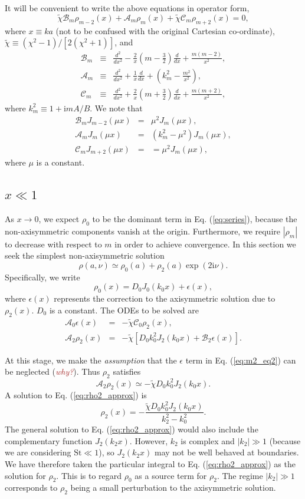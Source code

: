 \documentclass[apj]{emulateapj}
\def\brown#1{\textcolor{brown}{#1}}
\newcommand{\comm}[1]{({\it \brown{#1}})}
\newcommand{\Eq}[1]{Eq. (\ref{#1})}
\newcommand{\eq}[1]{\Eq{#1}}
\newcommand{\beq}{\begin{equation}}
\newcommand{\eeq}{\end{equation}}
\newcommand{\beqn}{\begin{eqnarray}}
\newcommand{\eeqn}{\end{eqnarray}}
\begin{document}
It will be convenient to write the above equations
in operator form,
\beq\label{eq:ode2}
\tilde{\chi}\mathcal{B}_m\rho_{m-2}(x) + \mathcal{A}_m\rho_m(x) + \tilde{\chi}\mathcal{C}_m\rho_{m+2}(x)=0,
\eeq
where $x\equiv ka$ (not to be confused with the original Cartesian
co-ordinate), $\tilde{\chi}\equiv(\chi^2-1)/[2(\chi^2+1)]$, and 
\beqn\label{eq:ops}
\mathcal{B}_m &\equiv& \frac{d^2}{dx^2} -
\frac{2}{x}\left(m-\frac{3}{2}\right)\frac{d}{dx} + \frac{m(m-2)}{x^2},\\
\mathcal{A}_m &\equiv& \frac{d^2}{dx^2} + \frac{1}{x}\frac{d}{dx} +
\left(k_m^2 - \frac{m^2}{x^2}\right),\\
\mathcal{C}_m  &\equiv& \frac{d^2}{dx^2} +
\frac{2}{x}\left(m+\frac{3}{2}\right)\frac{d}{dx} +
\frac{m(m+2)}{x^2}, 
\eeqn
where $k_m^2 \equiv 1+\mathrm{i}mA/B$. We note that
\beqn\label{eq:ops2}
\mathcal{B}_mJ_{m-2}(\mu x) &=& \mu^2J_m(\mu x),\\
\mathcal{A}_mJ_m(\mu x) &=& \left(k_m^2 - \mu^2\right)J_m(\mu x),\\
\mathcal{C}_mJ_{m+2}(\mu x) &= & = \mu^2J_m(\mu x),
\eeqn
where $\mu$ is a constant. 

\subsection{$x\ll 1$}
As $x\to0$, we expect $\rho_0$ to be the dominant term in
\eq{eq:series}, because the non-axisymmetric components vanish
at the origin. Furthermore, we require $|\rho_m|$ to decrease with
respect to $m$ in order to achieve convergence. In this section we
seek the simplest non-axisymmetric solution
\beq
\rho(a,\nu) \simeq \rho_0(a) + \rho_2(a)\exp{\left(2\mathrm{i}\nu\right)}. 
\eeq
Specifically, we write
\beq
\rho_0(x) = D_0J_0(k_0x) + \epsilon(x),  
\eeq
where $\epsilon(x)$ represents the correction to the axisymmetric
solution due to $\rho_2(x)$. $D_0$ is a constant. The ODEs to be
solved are 
\beqn
\mathcal{A}_0\epsilon(x) &=& -\tilde{\chi}\mathcal{C}_0\rho_2(x),\label{eq:m2_eq1}\\
\mathcal{A}_2\rho_2(x) &=& -\tilde{\chi}\left[D_0k_0^2J_2(k_0x) +
  \mathcal{B}_2\epsilon(x)\right].\label{eq:m2_eq2} 
\eeqn

At this stage, we make the \emph{assumption} that the $\epsilon$ term
in \eq{eq:m2_eq2} can be neglected \comm{why?}. Thus $\rho_2$ satisfies
\beq\label{eq:rho2_approx}
\mathcal{A}_2\rho_2(x) \simeq -\tilde{\chi}D_0k_0^2J_2(k_0x).
\eeq
A solution to \eq{eq:rho2_approx} is
\beq\label{eq:rho2_approx_sol}
\rho_2(x)  = -\frac{\tilde{\chi}D_0k_0^2J_2(k_0x)}{k_2^2 - k_0^2}. 
\eeq
The general solution to \eq{eq:rho2_approx} would also include the
complementary function $J_2(k_2x)$. However, $k_2$ is complex and $|k_2|\gg 1$ (because we are considering
$\mathrm{St}\ll1$), so $J_2(k_2x)$
may not be well behaved at boundaries. We have therefore taken the
particular integral to \eq{eq:rho2_approx} as the solution for
$\rho_2$. This is to regard $\rho_0$ as a source term for
$\rho_2$. The regime $|k_2|\gg1$ corresponds to  
$\rho_2$ being a small perturbation to the
axisymmetric solution. 
\end{document}
